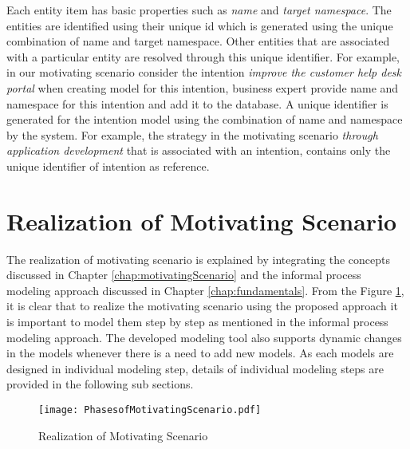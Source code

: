 Each entity item has basic properties such as \textit{name} and \textit{target namespace}. The entities are identified using their unique id which is generated using the unique combination of name and target namespace. Other entities that are associated with a particular entity are resolved through this unique identifier. For example, in our motivating scenario consider the intention \textit{improve the customer help desk portal} when creating model for this intention, business expert provide name and namespace for this intention and add it to the database. A unique identifier is generated for the intention model using the combination of name and namespace by the system. For example, the strategy in the motivating scenario \textit{through application  development} that is associated with an intention, contains only the unique identifier of intention as reference. 

\section{Realization of Motivating Scenario}
\label{sec:realization}
The realization of motivating scenario is explained by integrating the concepts discussed in Chapter \ref{chap:motivatingScenario} and the informal process modeling approach discussed in Chapter \ref{chap:fundamentals}. From the Figure \ref{fig:realizationofmotivatingscenario}, it is clear that to realize the motivating scenario using the proposed approach it is important to model them step by step as mentioned in the informal process modeling approach. The developed modeling tool also supports dynamic changes in the models whenever there is a need to add new models. As each models are designed in individual modeling step, details of individual modeling steps are provided in the following sub sections. 

\begin{figure}
	\centering
	\texttt{[image: PhasesofMotivatingScenario.pdf]}
	\caption{Realization of Motivating Scenario}
	\label{fig:realizationofmotivatingscenario}
\end{figure}

